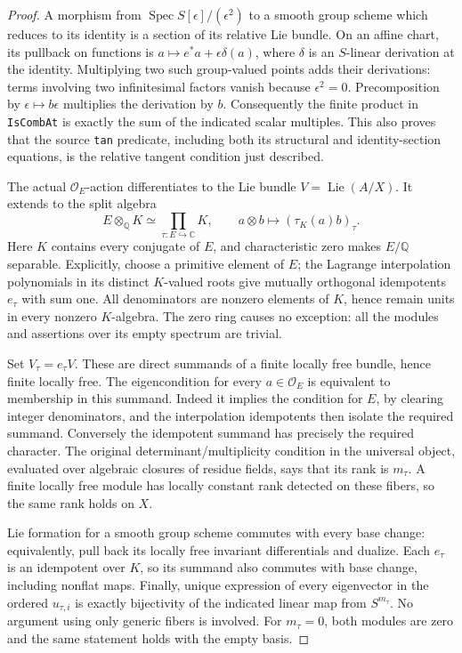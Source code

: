 \begin{proof}
A morphism from \(\operatorname{Spec}S[\epsilon]/(\epsilon^2)\)
to a smooth group scheme which reduces to its identity is a section
of its relative Lie bundle.  On an affine chart, its pullback on
functions is \(a\mapsto e^*a+\epsilon\delta(a)\), where
\(\delta\) is an \(S\)-linear derivation at the identity.  Multiplying
two such group-valued points adds their derivations: terms involving
two infinitesimal factors vanish because \(\epsilon^2=0\).
Precomposition by \(\epsilon\mapsto b\epsilon\) multiplies the
derivation by \(b\).  Consequently the finite product in
\texttt{IsCombAt} is exactly the sum of the indicated scalar
multiples.  This also proves that the source \texttt{tan} predicate,
including both its structural and identity-section equations, is
the relative tangent condition just described.

The actual \(\mathcal O_E\)-action differentiates to the Lie bundle
\(V=\operatorname{Lie}(A/X)\).  It extends to the split algebra
\[
 E\otimes_{\mathbb Q}K\simeq\prod_{\tau:E\hookrightarrow\mathbb C}K,
 \qquad a\otimes b\longmapsto(\tau_K(a)b)_\tau .             \tag{TDR.3}
\]
Here \(K\) contains every conjugate of \(E\), and characteristic
zero makes \(E/\mathbb Q\) separable.  Explicitly, choose a primitive
element of \(E\); the Lagrange interpolation polynomials in its
distinct \(K\)-valued roots give mutually orthogonal idempotents
\(e_\tau\) with sum one.  All denominators are nonzero elements
of \(K\), hence remain units in every nonzero \(K\)-algebra.
The zero ring causes no exception: all the modules and assertions
over its empty spectrum are trivial.

Set \(V_\tau=e_\tau V\).  These are direct summands of a finite
locally free bundle, hence finite locally free.  The eigencondition
for every \(a\in\mathcal O_E\) is equivalent to membership in this
summand.  Indeed it implies the condition for \(E\), by clearing
integer denominators, and the interpolation idempotents then isolate
the required summand.  Conversely the idempotent summand has precisely
the required character.  The original determinant/multiplicity
condition in the universal object, evaluated over algebraic closures
of residue fields, says that its rank is \(m_\tau\).  A finite
locally free module has locally constant rank detected on these
fibers, so the same rank holds on \(X\).

Lie formation for a smooth group scheme commutes with every base
change: equivalently, pull back its locally free invariant
differentials and dualize.  Each \(e_\tau\) is an idempotent over
\(K\), so its summand also commutes with base change, including
nonflat maps.  Finally, unique expression of every eigenvector in
the ordered \(u_{\tau,i}\) is exactly bijectivity of the indicated
linear map from \(S^{m_\tau}\).  No argument using only generic
fibers is involved.  For \(m_\tau=0\), both modules are zero and
the same statement holds with the empty basis.
\end{proof}

